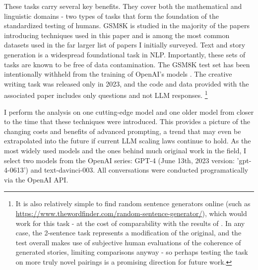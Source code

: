 \documentclass[11pt]{article}
\begin{document}
These tasks carry several key benefits. They cover both the mathematical and linguistic domains - two types of tasks that form the foundation of the standardized testing of humans. GSM8K is studied in the majority of the papers introducing techniques used in this paper and is among the most common datasets used in the far larger list of papers I initially surveyed. Text and story generation is a widespread foundational task in NLP. Importantly, these sets of tasks are known to be free of data contamination. The GSM8K test set has been intentionally withheld from the training of OpenAI's models \cite{openai_gpt-4_2023}. The creative writing task was released only in 2023, and the code and data provided with the associated paper includes only questions and not LLM responses. \footnote{It is also relatively simple to find random sentence generators online (such as \url{https://www.thewordfinder.com/random-sentence-generator/}), which would work for this task - at the cost of comparability with the results of \cite{yao_tree_2023}. In any case, the 2-sentence task represents a modification of the original, and the test overall makes use of subjective human evaluations of the coherence of generated stories, limiting comparisons anyway - so perhaps testing the task on more truly novel pairings is a promising direction for future work.}

I perform the analysis on one cutting-edge model and one older model from closer to the time that these techniques were introduced. This provides a picture of the changing costs and benefits of advanced prompting, a trend that may even be extrapolated into the future if current LLM scaling laws continue to hold. As the most widely used models and the ones behind much original work in the field, I select two models from the OpenAI series: GPT-4 (June 13th, 2023 version: 'gpt-4-0613') and text-davinci-003. All conversations were conducted programatically via the OpenAI API.

\end{document}
